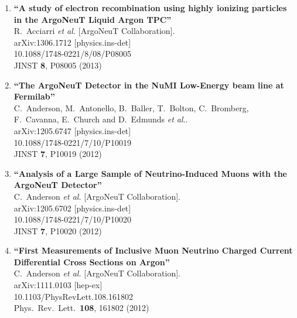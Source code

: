 \documentclass{res}
\begin{document}
\begin{resume}
\begin{enumerate}
\item%
{\bf ``A study of electron recombination using highly ionizing particles in the ArgoNeuT Liquid Argon TPC''}
  \\{}R.~Acciarri {\it et al.}  [ArgoNeuT Collaboration].
  \\{}arXiv:1306.1712 [physics.ins-det]
    \\{}10.1088/1748-0221/8/08/P08005
\\{}JINST {\bf 8}, P08005 (2013) %


\item%
{\bf ``The ArgoNeuT Detector in the NuMI Low-Energy beam line at Fermilab''}
  \\{}C.~Anderson, M.~Antonello, B.~Baller, T.~Bolton, C.~Bromberg, F.~Cavanna, E.~Church and D.~Edmunds {\it et al.}.
  \\{}arXiv:1205.6747 [physics.ins-det]
    \\{}10.1088/1748-0221/7/10/P10019
\\{}JINST {\bf 7}, P10019 (2012) %


\item%
{\bf ``Analysis of a Large Sample of Neutrino-Induced Muons with the ArgoNeuT Detector''}
  \\{}C.~Anderson {\it et al.}  [ArgoNeuT Collaboration].
  \\{}arXiv:1205.6702 [physics.ins-det]
    \\{}10.1088/1748-0221/7/10/P10020
\\{}JINST {\bf 7}, P10020 (2012) %


\item%
{\bf ``First Measurements of Inclusive Muon Neutrino Charged Current Differential Cross Sections on Argon''}
  \\{}C.~Anderson {\it et al.}  [ArgoNeuT Collaboration].
  \\{}arXiv:1111.0103 [hep-ex]
    \\{}10.1103/PhysRevLett.108.161802
\\{}Phys.\ Rev.\ Lett.\  {\bf 108}, 161802 (2012) %



\end{enumerate}
\end{resume}
\end{document}
